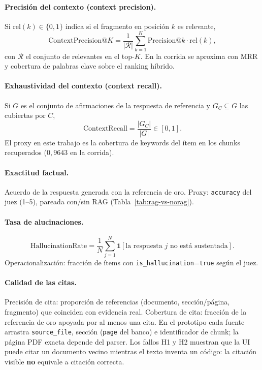 \paragraph{Precisión del contexto (context precision).}
Si $\mathrm{rel}(k)\in\{0,1\}$ indica si el fragmento en posición $k$ es relevante,
\begin{equation}
\mathrm{ContextPrecision@}K=\frac{1}{|\mathcal{R}|}\sum_{k=1}^{K}\mathrm{Precision@}k\cdot\mathrm{rel}(k),
\end{equation}
con $\mathcal{R}$ el conjunto de relevantes en el top-$K$. En la corrida se aproxima con MRR y cobertura de palabras clave sobre el ranking híbrido.

\paragraph{Exhaustividad del contexto (context recall).}
Si $G$ es el conjunto de afirmaciones de la respuesta de referencia y $G_C\subseteq G$ las cubiertas por $C$,
\begin{equation}
\mathrm{ContextRecall}=\frac{|G_C|}{|G|}\in[0,1].
\end{equation}
El proxy en este trabajo es la cobertura de keywords del ítem en los chunks recuperados ($0{,}9643$ en la corrida).

\paragraph{Exactitud factual.}
Acuerdo de la respuesta generada con la referencia de oro. Proxy: \texttt{accuracy} del juez (1--5), pareada con/sin RAG (Tabla~\ref{tab:rag-vs-norag}).

\paragraph{Tasa de alucinaciones.}
\begin{equation}
\mathrm{HallucinationRate}=\frac{1}{N}\sum_{j=1}^{N}\mathbf{1}[\text{la respuesta }j\text{ no está sustentada}].
\end{equation}
Operacionalización: fracción de ítems con \texttt{is\_hallucination}=\texttt{true} según el juez.

\paragraph{Calidad de las citas.}
Precisión de cita: proporción de referencias (documento, sección/página, fragmento) que coinciden con evidencia real. Cobertura de cita: fracción de la referencia de oro apoyada por al menos una cita. En el prototipo cada fuente arrastra \texttt{source\_file}, sección (\texttt{page} del banco) e identificador de chunk; la página PDF exacta depende del parser. Los fallos H1 y H2 muestran que la UI puede citar un documento vecino mientras el texto inventa un código: la citación visible \textbf{no} equivale a citación correcta.




